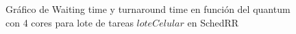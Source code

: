 \begin{figure}[H]
\hfill
{}
\hfill
{}
\hfill
\caption{Gráfico de Waiting time y turnaround time en función del quantum con 4 cores para lote de tareas $loteCelular$ en SchedRR}
\end{figure}

